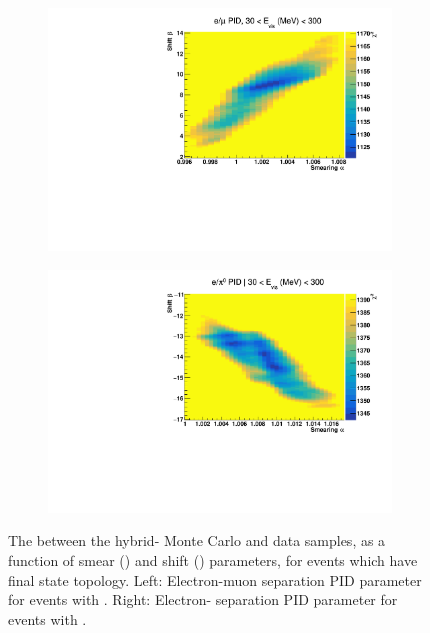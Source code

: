 \begin{figure}[h]
  \begin{subfigure}[t]{0.49\textwidth}
    \includegraphics[width=\textwidth, trim={0mm 0mm 0mm 0mm}, clip,page=1]{Figures/Selections/EMUPID_Elt300_Chi2Map.pdf}
  \end{subfigure}%
  \begin{subfigure}[t]{0.49\textwidth}
    \includegraphics[width=\textwidth, trim={0mm 0mm 0mm 0mm}, clip,page=1]{Figures/Selections/EPI0PID_Elt300_Chi2Map.pdf}
  \end{subfigure}
  \caption{The  between the hybrid- Monte Carlo and data samples, as a function of smear (\quickmath{\alpha}) and shift (\quickmath{\beta}) parameters, for events which have  final state topology. Left: Electron-muon separation PID parameter for events with . Right: Electron- separation PID parameter for events with .}
  \label{fig:SelsAndSysts_HybridChi2Maps}
\end{figure}


